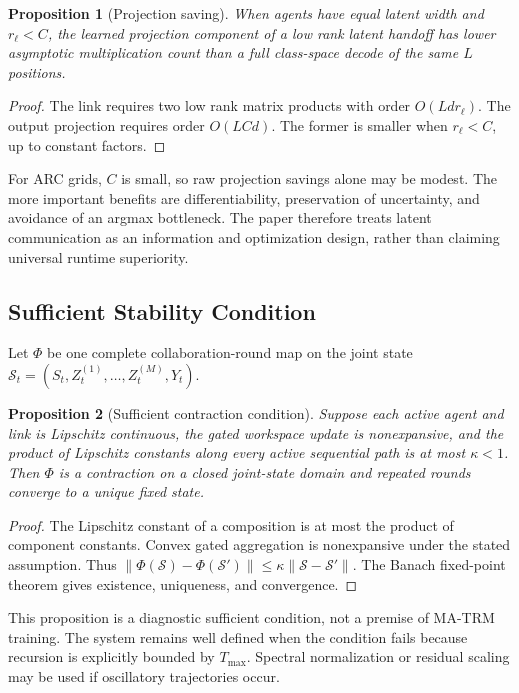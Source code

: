 \documentclass[10pt,a4paper,twocolumn]{article}
\newtheorem{proposition}{Proposition}
\newcommand{\MA}{\textsc{MA-TRM}}
\begin{document}
\begin{proposition}[Projection saving]
When agents have equal latent width and $r_\ell<C$, the learned projection component of a low rank latent handoff has lower asymptotic multiplication count than a full class-space decode of the same $L$ positions.
\end{proposition}
\begin{proof}
The link requires two low rank matrix products with order $O(Ldr_\ell)$. The output projection requires order $O(LCd)$. The former is smaller when $r_\ell<C$, up to constant factors.
\end{proof}

For ARC grids, $C$ is small, so raw projection savings alone may be modest. The more important benefits are differentiability, preservation of uncertainty, and avoidance of an argmax bottleneck. The paper therefore treats latent communication as an information and optimization design, rather than claiming universal runtime superiority.

\subsection{Sufficient Stability Condition}
Let $\Phi$ be one complete collaboration-round map on the joint state $\mathcal{S}_t=(S_t,Z_t^{(1)},\ldots,Z_t^{(M)},Y_t)$.

\begin{proposition}[Sufficient contraction condition]
Suppose each active agent and link is Lipschitz continuous, the gated workspace update is nonexpansive, and the product of Lipschitz constants along every active sequential path is at most $\kappa<1$. Then $\Phi$ is a contraction on a closed joint-state domain and repeated rounds converge to a unique fixed state.
\end{proposition}
\begin{proof}
The Lipschitz constant of a composition is at most the product of component constants. Convex gated aggregation is nonexpansive under the stated assumption. Thus $\|\Phi(\mathcal{S})-\Phi(\mathcal{S}')\|\le\kappa\|\mathcal{S}-\mathcal{S}'\|$. The Banach fixed-point theorem gives existence, uniqueness, and convergence.
\end{proof}

This proposition is a diagnostic sufficient condition, not a premise of \MA{} training. The system remains well defined when the condition fails because recursion is explicitly bounded by $T_{\max}$. Spectral normalization or residual scaling may be used if oscillatory trajectories occur.
\end{document}
